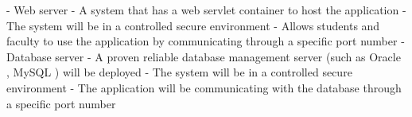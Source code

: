 - Web server 
	- A system that has a web servlet container to host the application
	- The system will be in a controlled secure environment 
	- Allows students and faculty to use the application by communicating through a specific port number
- Database server 
	- A proven reliable database management server (such as Oracle , MySQL ) will be deployed 
	- The system will be in a controlled secure environment 
	- The application will be communicating with the database through a specific port number
